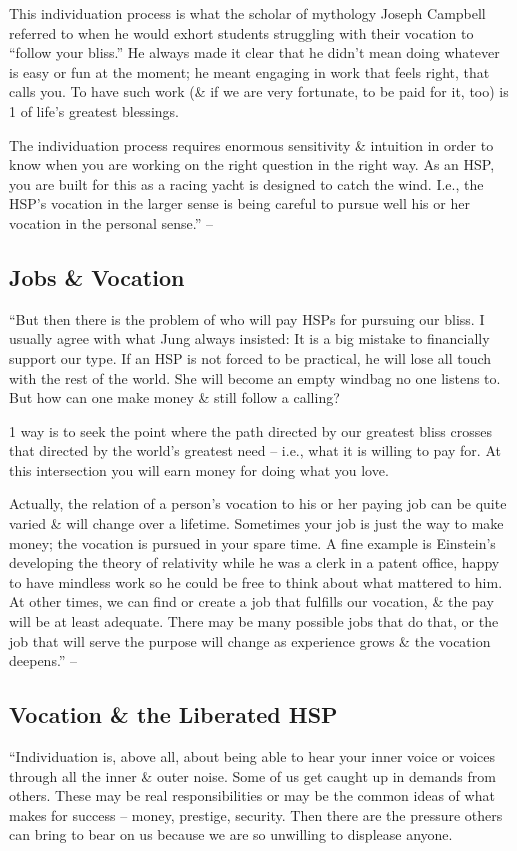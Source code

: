 \documentclass{article}
\numberwithin{equation}{section}
\begin{document}
This individuation process is what the scholar of mythology Joseph Campbell referred to when he would exhort students struggling with their vocation to ``follow your bliss.'' He always made it clear that he didn't mean doing whatever is easy or fun at the moment; he meant engaging in work that feels right, that calls you. To have such work (\& if we are very fortunate, to be paid for it, too) is 1 of life's greatest blessings.

The individuation process requires enormous sensitivity \& intuition in order to know when you are working on the right question in the right way. As an HSP, you are built for this as a racing yacht is designed to catch the wind. I.e., the HSP's vocation in the larger sense is being careful to pursue well his or her vocation in the personal sense.'' -- \cite[p. 149]{Aron2013}

\subsection{Jobs \& Vocation}
``But then there is the problem of who will pay HSPs for pursuing our bliss. I usually agree with what Jung always insisted: It is a big mistake to financially support our type. If an HSP is not forced to be practical, he will lose all touch with the rest of the world. She will become an empty windbag no one listens to. But how can one make money \& still follow a calling?

1 way is to seek the point where the path directed by our greatest bliss crosses that directed by the world's greatest need -- i.e., what it is willing to pay for. At this intersection you will earn money for doing what you love.

Actually, the relation of a person's vocation to his or her paying job can be quite varied \& will change over a lifetime. Sometimes your job is just the way to make money; the vocation is pursued in your spare time. A fine example is Einstein's developing the theory of relativity while he was a clerk in a patent office, happy to have mindless work so he could be free to think about what mattered to him. At other times, we can find or create a job that fulfills our vocation, \& the pay will be at least adequate. There may be many possible jobs that do that, or the job that will serve the purpose will change as experience grows \& the vocation deepens.'' -- \cite[pp. 149--150]{Aron2013}

\subsection{Vocation \& the Liberated HSP}
``Individuation is, above all, about being able to hear your inner voice or voices through all the inner \& outer noise. Some of us get caught up in demands from others. These may be real responsibilities or may be the common ideas of what makes for success -- money, prestige, security. Then there are the pressure others can bring to bear on us because we are so unwilling to displease anyone.
\end{document}

